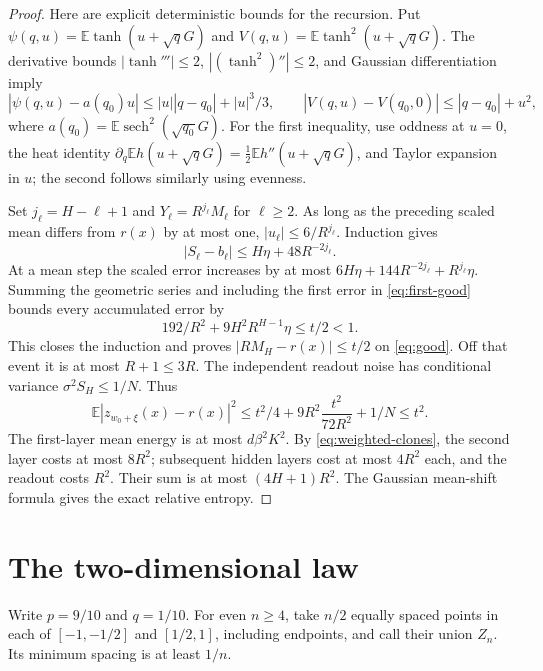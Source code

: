 \documentclass[11pt]{article}
\newcommand{\E}{\mathbb E}\newcommand{\Pp}{\mathbb P}\newcommand{\R}{\mathbb R}
\begin{document}
\begin{proof}
Here are explicit deterministic bounds for the recursion. Put
$\psi(q,u)=\E\tanh(u+\sqrt qG)$ and $V(q,u)=\E\tanh^2(u+\sqrt qG)$.
The derivative bounds $|\tanh'''|\le2$, $|(\tanh^2)''|\le2$, and Gaussian differentiation imply
\[
 |\psi(q,u)-a(q_0)u|\le |u||q-q_0|+|u|^3/3,
 \qquad |V(q,u)-V(q_0,0)|\le|q-q_0|+u^2,
\]
where $a(q_0)=\E\operatorname{sech}^2(\sqrt{q_0}G)$. For the first inequality, use oddness at $u=0$, the heat identity $\partial_q\E h(u+\sqrt qG)=\frac12\E h''(u+\sqrt qG)$, and Taylor expansion in $u$; the second follows similarly using evenness.

Set $j_\ell=H-\ell+1$ and $Y_\ell=R^{j_\ell}M_\ell$ for $\ell\ge2$. As long as the preceding scaled mean differs from $r(x)$ by at most one, $|u_\ell|\le6/R^{j_\ell}$. Induction gives
\[
 |S_\ell-b_\ell|\le H\eta+48R^{-2j_\ell}.
\]
At a mean step the scaled error increases by at most
$6H\eta+144R^{-2j_\ell}+R^{j_\ell}\eta$.
Summing the geometric series and including the first error in \eqref{eq:first-good} bounds every accumulated error by
\[
 192/R^2+9H^2R^{H-1}\eta\le t/2<1.
\]
This closes the induction and proves $|RM_H-r(x)|\le t/2$ on \eqref{eq:good}. Off that event it is at most $R+1\le3R$. The independent readout noise has conditional variance $\sigma^2S_H\le1/N$. Thus
\[
 \E|z_{w_0+\xi}(x)-r(x)|^2\le t^2/4+9R^2\frac{t^2}{72R^2}+1/N\le t^2.
\]
The first-layer mean energy is at most $d\beta^2K^2$. By \eqref{eq:weighted-clones}, the second layer costs at most $8R^2$; subsequent hidden layers cost at most $4R^2$ each, and the readout costs $R^2$. Their sum is at most $(4H+1)R^2$. The Gaussian mean-shift formula gives the exact relative entropy.
\end{proof}

\section{The two-dimensional law}
Write $p=9/10$ and $q=1/10$. For even $n\ge4$, take $n/2$ equally spaced points in each of $[-1,-1/2]$ and $[1/2,1]$, including endpoints, and call their union $Z_n$. Its minimum spacing is at least $1/n$.
\end{document}
